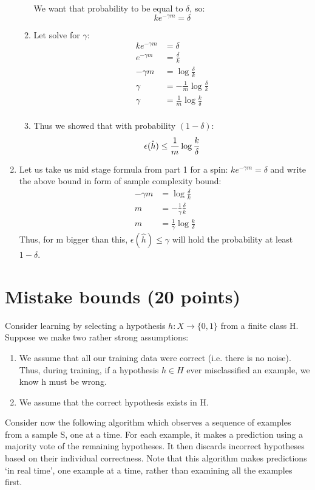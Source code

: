 \documentclass{article}
\newcommand{\hhat}{\hat{h}}
\begin{document}
\begin{enumerate}
\begin{enumerate}
			We want that probability to be equal to $\delta$, so:
			$$ke^{-\gamma m}  = \delta$$
						
			\item Let solve for $\gamma$:
			\begin{align*}
			ke^{-\gamma m} &= \delta\\
			e^{-\gamma m} &= \frac{\delta}{k}\\
			-\gamma m &= \log \frac{\delta}{k}\\
			\gamma &= -\frac{1}{m}\log \frac{\delta}{k}\\
			\gamma &= \frac{1}{m}\log \frac{k}{\delta}\\
			\end{align*}
			
			\item Thus we showed that with probability $(1 - \delta)$:
			$$\epsilon(\hhat) \le \frac{1}{m}\log \frac{k}{\delta}\\$$			
		\end{enumerate}
		
		\item  Let us take us mid stage formula from part 1 for a spin: $ke^{-\gamma m}  = \delta$ and write the above bound in form of sample complexity bound:
		\begin{align*}
		-\gamma m &= \log \frac{\delta}{k}\\
		m &= -\frac{1}{\gamma}\frac{\delta}{k}\\
		m & = \frac{1}{\gamma}\log \frac{k}{\delta}
		\end{align*}
		Thus, for m bigger than this, $\epsilon(\hhat) \le \gamma$ will hold the probability at least $1-\delta$.
	\end{enumerate}

\pagebreak
\section{Mistake bounds (20 points)}	
	Consider learning by selecting a hypothesis $h : X \rightarrow \{0, 1\}$ from a finite class H. Suppose we make two	rather strong assumptions:	
	\begin{enumerate}
		\item We assume that all our training data were correct (i.e. there is no noise). Thus, during training, if a hypothesis $h \in H$ ever misclassified an example, we know h must be wrong.
		\item We assume that the correct hypothesis exists in H.
	\end{enumerate}	
	Consider now the following algorithm which observes a sequence of examples from a sample S, one at a time.
	For each example, it makes a prediction using a majority vote of the remaining hypotheses. It then discards
	incorrect hypotheses based on their individual correctness. Note that this algorithm makes predictions `in
	real time', one example at a time, rather than examining all the examples first.
	
\end{document}
